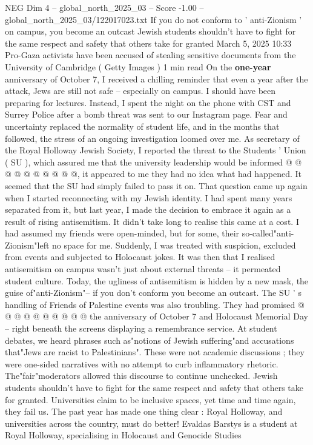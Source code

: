 \begin{textsample}{NEG Dim 4 – global\_north\_2025\_03 – Score -1.00 – global\_north\_2025\_03/122017023.txt}  \label{ex:f4_neg_391}
If you do not conform to ' anti-Zionism ' on campus, you become an outcast Jewish students shouldn't have to fight for the same respect and safety that others take for granted March 5, 2025 10:33 Pro-Gaza activists have been accused of stealing sensitive documents from the University of Cambridge ( Getty Images ) 1 min read On the \textbf{one-year} anniversary of October 7, I received a chilling reminder that even a year after the attack, Jews are still not safe -- especially on campus.
I should have been preparing for lectures.
Instead, I spent the night on the phone with CST and Surrey Police after a bomb threat was sent to our Instagram page.
Fear and uncertainty replaced the normality of student life, and in the months that followed, the stress of an ongoing investigation loomed over me.
As secretary of the Royal Holloway Jewish Society, I reported the threat to the Students ' Union ( SU ), which assured me that the university leadership would be informed @ @ @ @ @ @ @ @ @ @, it appeared to me they had no idea what had happened.
It seemed that the SU had simply failed to pass it on.
That question came up again when I started reconnecting with my Jewish identity.
I had spent many years separated from it, but last year, I made the decision to embrace it again as a result of rising antisemitism.
It didn't take long to realise this came at a cost.
I had assumed my friends were open-minded, but for some, their so-called"anti-Zionism"left no space for me.
Suddenly, I was treated with suspicion, excluded from events and subjected to Holocaust jokes.
It was then that I realised antisemitism on campus wasn't just about external threats -- it permeated student culture.
Today, the ugliness of antisemitism is hidden by a new mask, the guise of"anti-Zionism"-- if you don't conform you become an outcast.
The SU ' s handling of Friends of Palestine events was also troubling.
They had promised @ @ @ @ @ @ @ @ @ @ the anniversary of October 7 and Holocaust Memorial Day -- right beneath the screens displaying a remembrance service.
At student debates, we heard phrases such as"notions of Jewish suffering"and accusations that"Jews are racist to Palestinians".
These were not academic discussions ; they were one-sided narratives with no attempt to curb inflammatory rhetoric.
The"fair"moderators allowed this discourse to continue unchecked.
Jewish students shouldn't have to fight for the same respect and safety that others take for granted.
Universities claim to be inclusive spaces, yet time and time again, they fail us.
The past year has made one thing clear : Royal Holloway, and universities across the country, must do better!
Evaldas Barstys is a student at Royal Holloway, specialising in Holocaust and Genocide Studies

\end{textsample}

